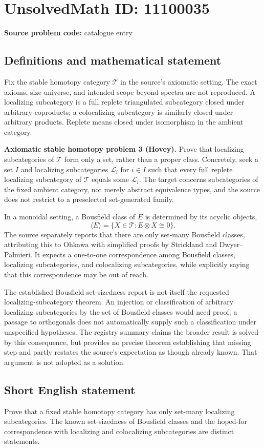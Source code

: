 \documentclass[11pt]{article}
\begin{document}
\section*{UnsolvedMath ID: 11100035}
\textbf{Source problem code:} catalogue entry
\subsection{Definitions and mathematical statement}
Fix the stable homotopy category $\mathcal T$ in the source's axiomatic setting. The exact axioms, size universe, and intended scope beyond spectra are not reproduced. A localizing subcategory is a full replete triangulated subcategory closed under arbitrary coproducts; a colocalizing subcategory is similarly closed under arbitrary products. Replete means closed under isomorphism in the ambient category.

\textbf{Axiomatic stable homotopy problem 3 (Hovey).} Prove that localizing subcategories of $\mathcal T$ form only a set, rather than a proper class. Concretely, seek a set $I$ and localizing subcategories $\mathcal L_i$ for $i\in I$ such that every full replete localizing subcategory of $\mathcal T$ equals some $\mathcal L_i$. The target concerns subcategories of the fixed ambient category, not merely abstract equivalence types, and the source does not restrict to a preselected set-generated family.

In a monoidal setting, a Bousfield class of $E$ is determined by its acyclic objects,
\[
 \langle E\rangle=\{X\in\mathcal T:E\otimes X\cong0\}.
\]
The source separately reports that there are only set-many Bousfield classes, attributing this to Ohkawa with simplified proofs by Strickland and Dwyer--Palmieri. It expects a one-to-one correspondence among Bousfield classes, localizing subcategories, and colocalizing subcategories, while explicitly saying that this correspondence may be out of reach.

The established Bousfield set-sizedness report is not itself the requested localizing-subcategory theorem. An injection or classification of arbitrary localizing subcategories by the set of Bousfield classes would need proof; a passage to orthogonals does not automatically supply such a classification under unspecified hypotheses. The registry summary claims the broader result is solved by this consequence, but provides no precise theorem establishing that missing step and partly restates the source's expectation as though already known. That argument is not adopted as a solution.
\subsection{Short English statement}
Prove that a fixed stable homotopy category has only set-many localizing subcategories. The known set-sizedness of Bousfield classes and the hoped-for correspondence with localizing and colocalizing subcategories are distinct statements.
\end{document}
